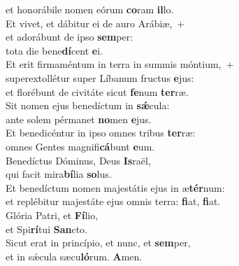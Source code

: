 \evenverse et honorábile nomen eórum \textbf{co}ram \textbf{il}lo.\\
\oddverse Et vivet, et dábitur ei de auro Arábiæ,~+\\
\oddverse  et adorábunt de ipso \textbf{sem}per:~\*\\
\oddverse tota die bene\textbf{dí}cent \textbf{e}i.\\
\evenverse Et erit firmaméntum in terra in summis móntium,~+\\
\evenverse  superextollétur super Líbanum fructus \textbf{e}jus:~\*\\
\evenverse et florébunt de civitáte sicut \textbf{fe}num \textbf{ter}ræ.\\
\oddverse Sit nomen ejus benedíctum in \textbf{sǽ}cula:~\*\\
\oddverse ante solem pérmanet \textbf{no}men \textbf{e}jus.\\
\evenverse Et benedicéntur in ipso omnes tribus \textbf{ter}ræ:~\*\\
\evenverse omnes Gentes magnifi\textbf{cá}bunt \textbf{e}um.\\
\oddverse Benedíctus Dóminus, Deus \textbf{Is}raël,~\*\\
\oddverse qui facit mira\textbf{bí}lia \textbf{so}lus.\\
\evenverse Et benedíctum nomen majestátis ejus in æ\textbf{tér}num:~\*\\
\evenverse et replébitur majestáte ejus omnis terra: \textbf{fi}at, \textbf{fi}at.\\
\oddverse Glória Patri, et \textbf{Fí}lio,~\*\\
\oddverse et Spi\textbf{rí}tui \textbf{San}cto.\\
\evenverse Sicut erat in princípio, et nunc, et \textbf{sem}per,~\*\\
\evenverse et in sǽcula sæcu\textbf{ló}rum. \textbf{A}men.\\
